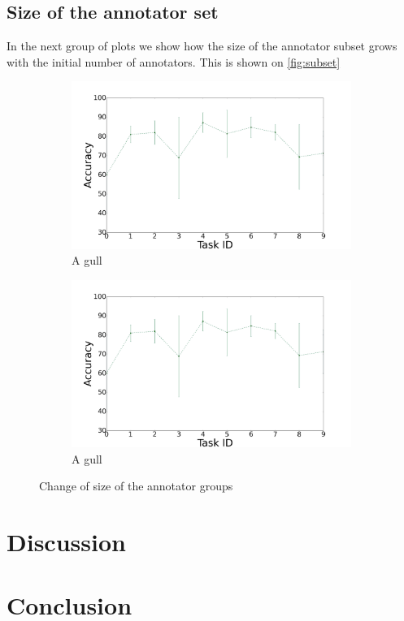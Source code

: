 \documentclass{llncs}
\begin{document}
\subsection{Size of the annotator set}

In the next group of plots we show how the size of the annotator subset grows with the initial number of annotators. This is shown on  \autoref{fig:subset}

\begin{figure}[!htb]
    \centering
    \begin{subfigure}[b]{0.45\textwidth}
        \includegraphics[width=\textwidth]{figures/plot_mlp}
        \caption{A gull}
    \end{subfigure}
    \begin{subfigure}[b]{0.45\textwidth}
        \includegraphics[width=\textwidth]{figures/plot_mlp}
        \caption{A gull}
    \end{subfigure}
  \caption{Change of size of the annotator groups}
  \label{fig:subset}
\end{figure}




\section{Discussion}


\section{Conclusion}
\end{document}
